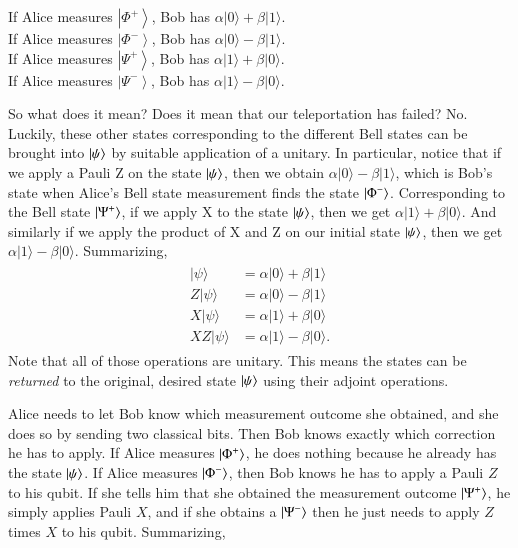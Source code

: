 \noindent
If Alice measures $\left|\Phi^{+}\right\rangle$, Bob has $\alpha|0\rangle+\beta|1\rangle$.\\
If Alice measures $\left|\Phi^{-}\right\rangle$, Bob has $\alpha|0\rangle-\beta|1\rangle$.\\
If Alice measures $\left|\Psi^{+}\right\rangle$, Bob has $\alpha|1\rangle+\beta|0\rangle$.\\
If Alice measures $\left|\Psi^{-}\right\rangle$, Bob has $\alpha|1\rangle-\beta|0\rangle$.

So what does it mean? Does it mean that our teleportation has failed? No. Luckily, these other states corresponding to the different Bell states can be brought into $\left| \psi \right\rangle$ by suitable application of a unitary. In particular, notice that if we apply a Pauli Z on the state $\left| \psi \right\rangle$, then we obtain $\alpha|0\rangle-\beta|1\rangle$, which is Bob's state when Alice's Bell state measurement finds the state $\left| \Phi^- \right\rangle$. Corresponding to the Bell state $\left| \Psi^+ \right\rangle$, if we apply X to the state $\left| \psi \right\rangle$, then we get $\alpha|1\rangle+\beta|0\rangle$. And similarly if we apply the product of X and Z on our initial state $\left| \psi \right\rangle$, then we get $\alpha|1\rangle-\beta|0\rangle$. Summarizing,
\begin{align}
\begin{aligned}
|\psi\rangle &=\alpha|0\rangle+\beta|1\rangle \\
Z|\psi\rangle &=\alpha|0\rangle-\beta|1\rangle \\
X|\psi\rangle &=\alpha|1\rangle+\beta|0\rangle \\
X Z|\psi\rangle &=\alpha|1\rangle-\beta|0\rangle.
\end{aligned}
\end{align}
Note that all of those operations are unitary.  This means the states can be \emph{returned} to the original, desired state $\left| \psi \right\rangle$ using their adjoint operations.

Alice needs to let Bob know which measurement outcome she obtained, and she does so by sending two classical bits. Then Bob knows exactly which correction he has to apply. If Alice measures $\left| \Phi^+ \right\rangle$, he does nothing because he already has the state $\left| \psi \right\rangle$. If Alice measures $\left| \Phi^- \right\rangle$, then Bob knows he has to apply a Pauli $Z$ to his qubit. If she tells him that she obtained the measurement outcome $\left| \Psi^+ \right\rangle$, he simply applies Pauli $X$, and if she obtains a $\left| \Psi^- \right\rangle$ then he just needs to apply $Z$ times $X$ to his qubit.  Summarizing,

